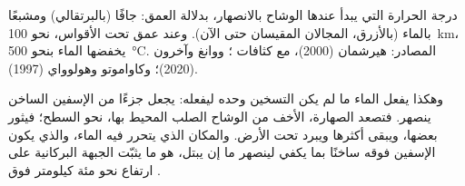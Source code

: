 \begin{omfigure}
{\small درجة الحرارة التي يبدأ عندها  الوشاح بالانصهار، بدلالة
العمق: جافًا (بالبرتقالي) ومشبعًا بالماء (بالأزرق، المجالان المقيسان
حتى الآن). وعند عمق  تحت الأقواس، نحو \qty{100}{km}، يخفضها
الماء بنحو \qty{500}{\celsius}. المصادر: هيرشمان (2000)، مع
كثافات ؛ ووانغ وآخرون (2020)؛ وكاواموتو وهولوواي (1997).}
\end{omfigure}

وهكذا يفعل الماء ما لم يكن التسخين وحده ليفعله: يجعل جزءًا من الإسفين
الساخن ينصهر. فتصعد الصهارة، الأخف من الوشاح الصلب المحيط بها،
نحو السطح؛ فيثور بعضها، ويبقى أكثرها ويبرد تحت الأرض.
والمكان الذي يتحرر فيه الماء، والذي يكون الإسفين فوقه ساخنًا بما يكفي
لينصهر ما إن يبتل، هو ما يثبّت الجبهة البركانية على ارتفاع نحو مئة كيلومتر
فوق .

